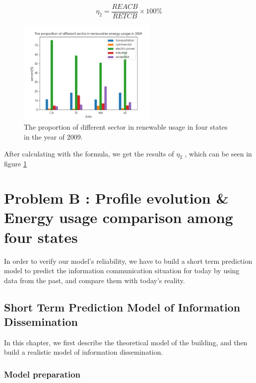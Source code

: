 \documentclass[a4paper,11pt]{article}
\begin{document}
\begin{equation}
    \eta_2=\frac{REACB}{RETCB} \times 100\%
\end{equation}

\begin{figure}[h]%
    \centering 
    \includegraphics[width=0.6\textwidth]{./Pic/1-3.png}
    \caption{The proportion of different sector in renewable usage in four states in the year of 2009.}
    \label{fig:1-3}  
\end{figure}
\par After calculating with the formula, we get the results of $\eta_2$ , which can be seen in figure \ref{fig:1-3}






\section{Problem B : Profile evolution \& Energy usage comparison among four states}

\par In order to verify our model's reliability, we have to build a short term prediction model to predict the information communication situation for today by using data from the past, and compare them with today's reality.
\subsection{Short Term Prediction Model of Information Dissemination}
\par In this chapter, we first describe the theoretical model of the building, and then build a realistic model of information dissemination.
\subsubsection{Model preparation}
\end{document}

